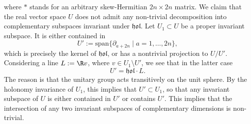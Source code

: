 where $\ast$ stands for an arbitrary skew-Hermitian $2n \times 2n$ matrix. We claim that the real vector space $U$ does not admit any
non-trivial decomposition into complementary subspaces invariant under $\mathfrak{hol}$. Let $U_1\subset U$ be a proper invariant subspace. It is either contained in
\[ U':= \mathrm{span}\{ \partial_{a+2n}\mid a=1,\ldots, 2n\},\]
which is precisely the kernel of $\mathfrak{hol}$, or has a nontrivial projection
to $U/U'$. Considering a line $L:=\R v$, where $v\in U_1 \setminus U'$, we see that in the latter case
\[ U'=\mathfrak{hol}\cdot L.\]
The reason is that the unitary group acts transitively on the unit sphere. By the holonomy invariance of $U_1$, this implies that $U'\subset U_1$, so that any
invariant subspace of $U$ is either contained in $U'$ or contains $U'$. This implies that the intersection
of any two invariant subspaces of complementary dimensions is non-trivial.
\eprf
